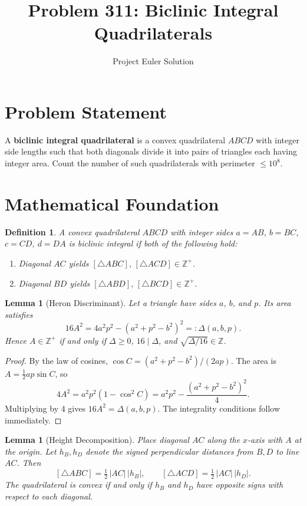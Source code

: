 \documentclass[12pt]{article}
\title{Problem 311: Biclinic Integral Quadrilaterals}
\author{Project Euler Solution}
\date{}
\newtheorem{lemma}[theorem]{Lemma}
\newtheorem{definition}[theorem]{Definition}
\begin{document}
\maketitle

\section{Problem Statement}

A \textbf{biclinic integral quadrilateral} is a convex quadrilateral $ABCD$ with integer side lengths such that both diagonals divide it into pairs of triangles each having integer area. Count the number of such quadrilaterals with perimeter $\le 10^8$.

\section{Mathematical Foundation}

\begin{definition}
A convex quadrilateral $ABCD$ with integer sides $a = AB$, $b = BC$, $c = CD$, $d = DA$ is \emph{biclinic integral} if both of the following hold:
\begin{enumerate}
    \item Diagonal $AC$ yields $[\triangle ABC],\, [\triangle ACD] \in \mathbb{Z}^+$.
    \item Diagonal $BD$ yields $[\triangle ABD],\, [\triangle BCD] \in \mathbb{Z}^+$.
\end{enumerate}
\end{definition}

\begin{lemma}[Heron Discriminant]\label{lem:heron}
Let a triangle have sides $a$, $b$, and $p$. Its area satisfies
\[
    16A^2 = 4a^2 p^2 - (a^2 + p^2 - b^2)^2 =: \Delta(a,b,p).
\]
Hence $A \in \mathbb{Z}^+$ if and only if $\Delta \ge 0$, $16 \mid \Delta$, and $\sqrt{\Delta/16} \in \mathbb{Z}$.
\end{lemma}

\begin{proof}
By the law of cosines, $\cos C = (a^2 + p^2 - b^2)/(2ap)$. The area is $A = \frac{1}{2}ap\sin C$, so
\[
    4A^2 = a^2 p^2(1 - \cos^2 C) = a^2 p^2 - \frac{(a^2 + p^2 - b^2)^2}{4}.
\]
Multiplying by 4 gives $16A^2 = \Delta(a,b,p)$. The integrality conditions follow immediately.
\end{proof}

\begin{lemma}[Height Decomposition]\label{lem:height}
Place diagonal $AC$ along the $x$-axis with $A$ at the origin. Let $h_B, h_D$ denote the signed perpendicular distances from $B, D$ to line $AC$. Then
\[
    [\triangle ABC] = \tfrac{1}{2}\,|AC|\,|h_B|, \qquad [\triangle ACD] = \tfrac{1}{2}\,|AC|\,|h_D|.
\]
The quadrilateral is convex if and only if $h_B$ and $h_D$ have opposite signs with respect to each diagonal.
\end{lemma}
\end{document}
